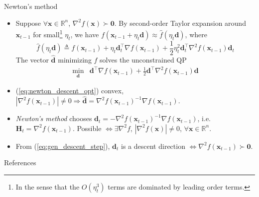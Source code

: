\documentclass{beamer}
\numberwithin{equation}{section}
\newcommand{\aref}[1]{\alert{\ref{#1}}}
\begin{document}
\begin{frame}{Newton's method}
    \begin{itemize}
        \item
        Suppose $ \forall \mathbf{x} \in \mathbb{R}^n $,
        $ \nabla^2f(\mathbf{x}) \succ \mathbf{0} $. By second-order Taylor
        expansion around $ \mathbf{x}_{t - 1} $ for small\footnote{
            In the sense that the $ O(\eta_t^3) $ terms are dominated by
            leading order terms.        
        } $ \eta_t $, we have $ f(\mathbf{x}_{t - 1} + \eta_t\mathbf{d})
        \approx \hat{f}(\eta_t\mathbf{d}) $, where
        \begin{equation*}
            \hat{f}(\eta_t\mathbf{d}) \triangleq
                f(\mathbf{x}_{t - 1}) + \eta_t\mathbf{d}_t^\top
                \nabla f(\mathbf{x}_{t - 1}) + \frac{1}{2}\eta_t^2
                \mathbf{d}_t^\top\nabla^2f(\mathbf{x}_{t - 1})\mathbf{d}_t
        \end{equation*}
        The vector $ \hat{\mathbf{d}} $ minimizing $ \hat{f} $ solves the
        unconstrained QP
        \begin{equation} \label{eq:newton_descent_opt}
            \begin{array}{ll}
                \displaystyle\min_{\mathbf{d}} &
                    \mathbf{d}^\top\nabla f(\mathbf{x}_{t - 1}) +
                    \frac{1}{2}\mathbf{d}^\top
                    \nabla^2f(\mathbf{x}_{t - 1})\mathbf{d}
            \end{array}
        \end{equation}

        \item
        (\aref{eq:newton_descent_opt}) convex,
        $ \left|\nabla^2f(\mathbf{x}_{t - 1})\right| \ne 0 \Rightarrow
        \hat{\mathbf{d}} = \nabla^2f(\mathbf{x}_{t - 1})^{-1}
        \nabla f(\mathbf{x}_{t - 1}) $.

        \item
        \textit{Newton's method} chooses $ \mathbf{d}_t =
        -\nabla^2f(\mathbf{x}_{t - 1})^{-1}\nabla f(\mathbf{x}_{t - 1}) $,
        i.e. $ \mathbf{H}_t = \nabla^2f(\mathbf{x}_{t - 1}) $. Possible
        $ \Leftrightarrow \exists\nabla^2f $,
        $ \left|\nabla^2f(\mathbf{x})\right| \ne 0 $,
        $ \forall \mathbf{x} \in \mathbb{R}^n $.

        \item
        From (\aref{eq:gen_descent_step}), $ \mathbf{d}_t $ is a descent
        direction $ \Leftrightarrow \nabla^2f(\mathbf{x}_{t - 1}) \succ
        \mathbf{0} $.
    \end{itemize}

    \medskip
\end{frame}


\begin{frame}{References}
    
    
\end{frame}
\end{document}
